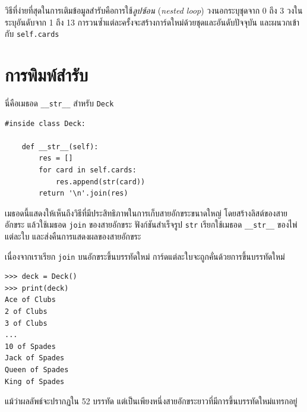 วิธีที่ง่ายที่สุดในการเติมข้อมูลสำรับคือการใช้\textit{ลูปซ้อน} (\textit{nested loop}) วงนอกระบุชุดจาก 0 ถึง 3 วงในระบุอันดับจาก 1 ถึง 13 การวนซ้ำแต่ละครั้งจะสร้างการ์ดใหม่ด้วยชุดและอันดับปัจจุบัน และผนวกเข้ากับ {\tt self.cards}


\section{การพิมพ์สำรับ} %
\label{printdeck}

นี่คือเมธอด \verb"__str__" สำหรับ {\tt Deck}

\begin{verbatim}
#inside class Deck:

    def __str__(self):
        res = []
        for card in self.cards:
            res.append(str(card))
        return '\n'.join(res)
\end{verbatim}
%

เมธอดนี้แสดงให้เห็นถึงวิธีที่มีประสิทธิภาพในการเก็บสายอักขระขนาดใหญ่ 
โดยสร้างลิสต์ของสายอักขระ 
แล้วใช้เมธอด {\tt join} ของสายอักขระ 
ฟังก์ชันสำเร็จรูป {\tt str} เรียกใช้เมธอด \verb"__str__" ของไพ่แต่ละใบ
และส่งคืนการแสดงผลของสายอักขระ 

เนื่องจากเราเรียก {\tt join} บนอักขระขึ้นบรรทัดใหม่ การ์ดแต่ละใบจะถูกคั่นด้วยการขึ้นบรรทัดใหม่

\begin{verbatim}
>>> deck = Deck()
>>> print(deck)
Ace of Clubs
2 of Clubs
3 of Clubs
...
10 of Spades
Jack of Spades
Queen of Spades
King of Spades
\end{verbatim}
%
แม้ว่าผลลัพธ์จะปรากฏใน 52 บรรทัด แต่เป็นเพียงหนึ่งสายอักขระยาวที่มีการขึ้นบรรทัดใหม่แทรกอยู่

